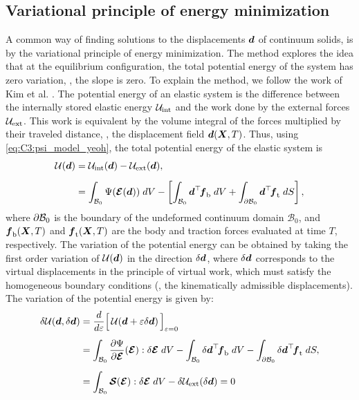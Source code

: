 \subsection{Variational principle of energy minimization}
A common way of finding solutions to the displacements ${\boldsymbol{d}}$ of continuum solids, is by the variational principle of energy minimization. The method explores the idea that at the equilibrium configuration, the total potential energy of the system has zero variation, \ie, the slope is zero. To explain the method, we follow the work of Kim et al. \cite{Kim2018}. The potential energy of an elastic system is the difference between the internally stored elastic energy $\mathcal{U}_{\textrm{int}}$ and the work done by the external forces $\mathcal{U}_{\textrm{ext}}$. This work is equivalent by the volume integral of the forces multiplied by their traveled distance, \ie, the displacement field ${\boldsymbol{d}}({\boldsymbol{X}},T)$. Thus, using \eqref{eq:C3:psi_model_yeoh}, the total potential energy of the elastic system is
%
\begin{align}
\mathcal{U}({\boldsymbol{d}}) &= \mathcal{U}_{\textrm{int}}({\boldsymbol{d}}) - \mathcal{U}_{\textrm{ext}}({\boldsymbol{d}}),  \notag\\[0.5em]
& = \int_{\mathcal{B}_0} \Psi(\boldsymbol{\mathcal{E}}({\boldsymbol{d}})) \; dV -  \left[\int_{\mathcal{B}_0} {\boldsymbol{d}}^\top \!{\boldsymbol{f}}_{\textrm{b}}   \; dV + \int_{\partial \mathcal{B}_0} {\boldsymbol{d}}^\top \!{\boldsymbol{f}}_{\textrm{t}} \; dS \right],
\end{align}
%
where $\partial \mathcal{B}_0$ is the boundary of the undeformed continuum domain $\mathcal{B}_0$, and ${\boldsymbol{f}}_{\textrm{b}}({\boldsymbol{X}},T)$ and ${\boldsymbol{f}}_{\textrm{t}}({\boldsymbol{X}},T)$ are the body and traction forces evaluated at time $T$, respectively. The variation of the potential energy can be obtained by taking the first order variation of $\mathcal{U}({\boldsymbol{d}})$ in the direction $\delta {\boldsymbol{d}}$, where $\delta {\boldsymbol{d}}$ corresponds to the virtual displacements in the principle of virtual work, which must satisfy the homogeneous boundary conditions (\ie, the kinematically admissible displacements).  The variation of the potential energy is given by:
%
\begin{align}
\delta \mathcal{U} ({\boldsymbol{d}}, \delta {\boldsymbol{d}}) & =  \frac{d}{d\varepsilon} \Big[ \,\mathcal{U} ({\boldsymbol{d}} + \varepsilon \delta {\boldsymbol{d}}) \, \Big]_{\varepsilon = 0} \notag \\[0.5em]
& =  \int_{\mathcal{B}_0} \frac{\partial \Psi}{\partial \boldsymbol{\mathcal{E}}}(\boldsymbol{\mathcal{E}}) : \delta \boldsymbol{\mathcal{E}} \; dV - \int_{\mathcal{B}_0}  \delta {\boldsymbol{d}}^\top \! {\boldsymbol{f}}_{\textrm{b}} \; dV - \int_{\partial \mathcal{B}_0}  \delta {\boldsymbol{d}}^\top \! {\boldsymbol{f}}_{\textrm{t}}  \; dS, \notag \\[0.5em]
& =  \int_{\mathcal{B}_0}\boldsymbol{\mathcal{S}}(\boldsymbol{\mathcal{E}}) : \delta \boldsymbol{\mathcal{E}} \; dV - \delta \mathcal{U}_{\textrm{ext}}(\delta {\boldsymbol{d}}) = 0
\end{align}
